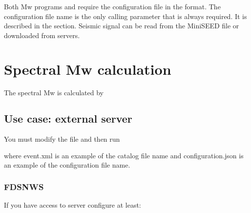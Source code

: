 \documentclass[letterpaper,10pt,english]{sphinxmanual}
\begin{document}
\sphinxAtStartPar
Both Mw programs  and  require the configuration file
in the  format.
The configuration file name is the only calling parameter that is always required.
It is described in the {\hyperref[\detokenize{configuration:configuration}]{}} section.
Seismic signal can be read from the MiniSEED file or downloaded from servers.


\section{Spectral Mw calculation}
\label{\detokenize{getting_started:spectral-mw-calculation}}
\sphinxAtStartPar
The spectral Mw is calculated by 


\subsection{Use case: external server}
\label{\detokenize{getting_started:use-case-external-server}}
\sphinxAtStartPar
You must modify the {\hyperref[\detokenize{configuration:configuration}]{}} file and then run

\begin{sphinxVerbatim}[commandchars=\\\{\}]
   
\end{sphinxVerbatim}

\sphinxAtStartPar
where event.xml is an example of the catalog file name
and configuration.json is an example of the configuration file name.


\subsubsection{FDSNWS}
\label{\detokenize{getting_started:fdsnws}}
\sphinxAtStartPar
If you have access to  server configure at least:

\begin{sphinxVerbatim}[commandchars=\\\{\}]
 
     
     
     
\end{sphinxVerbatim}
\end{document}
